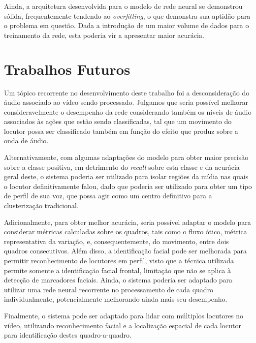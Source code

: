 Ainda, a arquitetura desenvolvida para o modelo de rede neural se demonstrou sólida, frequentemente tendendo ao \textit{overfitting}, o que demonstra sua aptidão para o problema em questão.
Dada a introdução de um maior volume de dados para o treinamento da rede, esta poderia vir a apresentar maior acurácia.

\section{Trabalhos Futuros}

Um tópico recorrente no desenvolvimento deste trabalho foi a desconsideração do áudio associado ao vídeo sendo processado.
Julgamos que seria possível melhorar consideravelmente o desempenho da rede considerando também os níveis de áudio associados às ações que estão sendo classificadas, tal que um movimento do locutor possa ser classificado também em função do efeito que produz sobre a onda de áudio.

Alternativamente, com algumas adaptações do modelo para obter maior precisão sobre a classe positiva, em detrimento do \textit{recall} sobre esta classe e da acurácia geral deste, o sistema poderia ser utilizado para isolar regiões da mídia nas quais o locutor definitivamente falou, dado que poderia ser utilizado para obter um tipo de perfil de sua voz, que possa agir como um centro definitivo para a clusterização tradicional.

Adicionalmente, para obter melhor acurácia, seria possível adaptar o modelo para considerar métricas calculadas sobre os quadros, tais como o fluxo ótico, métrica representativa da variação, e, consequentemente, do movimento, entre dois quadros consecutivos.
Além disso, a identificação facial pode ser melhorada para permitir reconhecimento de locutores em perfil, visto que a técnica utilizada permite somente a identificação facial frontal, limitação que não se aplica à detecção de marcadores faciais.
Ainda, o sistema poderia ser adaptado para utilizar uma rede neural recorrente no processamento de cada quadro individualmente, potencialmente melhorando ainda mais seu desempenho.

Finalmente, o sistema pode ser adaptado para lidar com múltiplos locutores no vídeo, utilizando reconhecimento facial e a localização espacial de cada locutor para identificação destes quadro-a-quadro.

